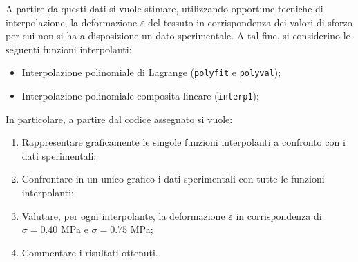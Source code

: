 \noindent
A partire da questi dati si vuole stimare, utilizzando opportune tecniche di interpolazione, la deformazione $\varepsilon$ del tessuto in corrispondenza dei valori di sforzo per cui non si ha a disposizione un dato sperimentale. A tal fine, si considerino le seguenti funzioni interpolanti:
\begin{itemize}
	\item Interpolazione polinomiale di Lagrange (\texttt{polyfit} e \texttt{polyval});
	\item Interpolazione polinomiale composita lineare (\texttt{interp1});
\end{itemize}
In particolare, a partire dal codice assegnato si vuole:
\begin{enumerate}
	\item Rappresentare graficamente le singole funzioni interpolanti a confronto con i dati sperimentali;

	\item Confrontare in un unico grafico i dati sperimentali con tutte le funzioni interpolanti;
	
	\item Valutare, per ogni interpolante, la deformazione $\varepsilon$ in corrispondenza di $\sigma = 0.40$ MPa e $\sigma = 0.75$ MPa;
	
	\item Commentare i risultati ottenuti.
\end{enumerate}

\newpage

